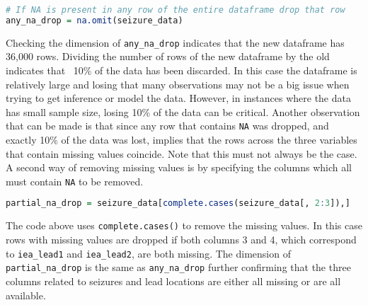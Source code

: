 \begin{lstlisting}[language=R]
# If NA is present in any row of the entire dataframe drop that row
any_na_drop = na.omit(seizure_data)
\end{lstlisting}
Checking the dimension of \verb|any_na_drop| indicates that the new dataframe has 36,000 rows. Dividing the number of rows of the new dataframe by the old indicates that ~10\% of the data has been discarded. In this case the dataframe is relatively large and losing that many observations may not be a big issue when trying to get inference or model the data. However, in instances where the data has small sample size, losing 10\% of the data can be critical. Another observation that can be made is that since any row that contains \verb|NA| was dropped, and exactly 10\% of the data was lost, implies that the rows across the three variables that contain missing values coincide. Note that this must not always be the case.
A second way of removing missing values is by specifying the columns which all must contain \verb|NA| to be removed.
\begin{lstlisting}[language=R]
partial_na_drop = seizure_data[complete.cases(seizure_data[, 2:3]),]
\end{lstlisting}
The code above uses \verb|complete.cases()| to remove the missing values. In this case rows with missing values are dropped if both columns 3 and 4, which correspond to \verb|iea_lead1| and \verb|iea_lead2|, are both missing. The dimension of \verb|partial_na_drop| is the same as \verb|any_na_drop| further confirming that the three columns related to seizures and lead locations are either all missing or are all available.

